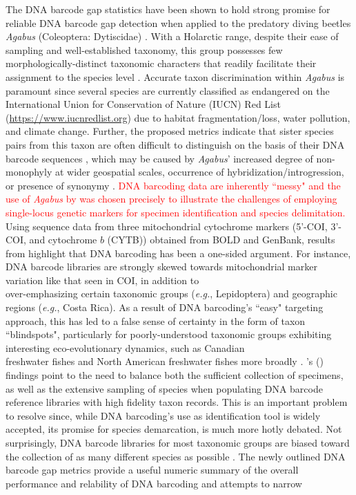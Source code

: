 \documentclass[12pt]{article}
\begin{document}
The DNA barcode gap statistics have been shown to hold strong promise for reliable DNA barcode gap detection when applied to the predatory diving beetles \textit{Agabus} (Coleoptera: Dytiscidae) \citep{phillips2024measure}. With a Holarctic range, despite their ease of sampling and well-established taxonomy, this group possesses few morphologically-distinct taxonomic characters that readily facilitate their assignment to the species level \citep{bergsten2012effect}. Accurate taxon discrimination within \textit{Agabus} is paramount since several species are currently classified as endangered on the International Union for Conservation of Nature (IUCN) Red List (\href{https://www.iucnredlist.org}{https://www.iucnredlist.org}) due to habitat fragmentation/loss, water pollution, and climate change. Further, the proposed metrics indicate that sister species pairs from this taxon are often difficult to distinguish on the basis of their DNA barcode sequences \citep{phillips2024measure}, which may be caused by \textit{Agabus}' increased degree of non-monophyly at wider geospatial scales, occurrence of hybridization/introgression, or presence of synonymy \citep{bergsten2012effect}. \textcolor{red}{DNA barcoding data are inherently ``messy" and the use of \textit{Agabus} by \citet{phillips2024measure} was chosen precisely to illustrate the challenges of employing single-locus genetic markers for specimen identification and species delimitation.} Using sequence data from three mitochondrial cytochrome markers (5'-COI, 3'-COI, and cytochrome $b$ (CYTB)) obtained from BOLD and GenBank, results from \citet{phillips2024measure} highlight that DNA barcoding has been a one-sided argument. For instance, DNA barcode libraries are strongly skewed towards mitochondrial marker variation like that seen in COI, in addition to \\ over-emphasizing certain taxonomic groups (\textit{e.g.}, Lepidoptera) and geographic regions (\textit{e.g.}, Costa Rica). As a result of DNA barcoding's ``easy" targeting approach, this has led to a false sense of certainty in the form of taxon ``blindspots", particularly for poorly-understood taxonomic groups exhibiting interesting eco-evolutionary dynamics, such as Canadian \\ freshwater fishes \citep{hubert2008identifying, morey2024taxonomic} and North American freshwater fishes more broadly \citep{april2011genetic}. \citeauthor{phillips2024measure}'s (\citeyear{phillips2024measure}) findings point to the need to balance both the sufficient collection of specimens, as well as the extensive sampling of species when populating DNA barcode reference libraries with high fidelity taxon records. This is an important problem to resolve since, while DNA barcoding's use as identification tool is widely accepted, its promise for species demarcation, is much more hotly debated. Not surprisingly, DNA barcode libraries for most taxonomic groups are biased toward the collection of as many different species as possible \citep{phillips2015exploration, phillips2019incomplete, phillips2022lack}. The newly outlined DNA barcode gap metrics provide a useful numeric summary of the overall performance and relability of DNA barcoding and attempts to narrow 
\end{document}
